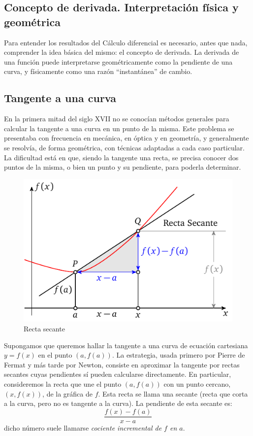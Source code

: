 \subsection{Concepto de derivada. Interpretación física y geométrica}

Para entender los resultados del Cálculo diferencial es necesario,
antes que nada, comprender la idea básica del mismo: el concepto de
derivada. La derivada de una función puede interpretarse geométricamente
como la pendiente de una curva, y físicamente como una razón ``instantánea''
de cambio. 

\subsection{Tangente a una curva}

En la primera mitad del siglo XVII no se conocían métodos generales
para calcular la tangente a una curva en un punto de la misma. Este
problema se presentaba con frecuencia en mecánica, en óptica y en
geometría, y generalmente se resolvía, de forma geométrica, con técnicas
adaptadas a cada caso particular. La dificultad está en que, siendo
la tangente una recta, se precisa conocer dos puntos de la misma,
o bien un punto y su pendiente, para poderla determinar.
\begin{figure}[H]
\centering\includegraphics[scale=0.6]{20_home_antalcides_Calculo_pdf_derivada-1.pdf}\caption{Recta secante}
\label{sect}

\end{figure}

Supongamos que queremos hallar la tangente a una curva de ecuación
cartesiana $y=f(x)$ en el punto $(a,f(a))$. La estrategia, usada
primero por Pierre de Fermat y más tarde por Newton, consiste en aproximar
la tangente por rectas secantes cuyas pendientes sí pueden calcularse
directamente. En particular, consideremos la recta que une el punto
$(a,f(a))$ con un punto cercano, $(x,f(x))$, de la gráfica de $f$.
Esta recta se llama una secante (recta que corta a la curva, pero
no es tangente a la curva). La pendiente de esta secante es: 
\[
\frac{f(x)-f(a)}{x-a}
\]
dicho número suele llamarse \emph{cociente incremental de $f$ en
$a$}.

